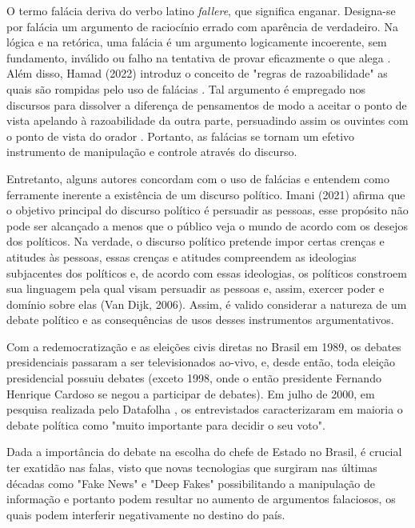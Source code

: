 \documentclass[12pt]{article}
\begin{document}
O termo falácia deriva do verbo latino \textit{fallere}, que significa enganar. Designa-se por falácia um argumento de raciocínio errado com aparência de verdadeiro. Na lógica e na retórica, uma falácia é um argumento logicamente incoerente, sem fundamento, inválido ou falho na tentativa de provar eficazmente o que alega \cite{Wikipédia-2}. Além disso, Hamad (2022) introduz o conceito de "regras de razoabilidade" as quais são rompidas pelo uso de falácias \cite{Hamad-3}. Tal argumento é empregado nos discursos para dissolver a diferença de pensamentos de modo a aceitar o ponto de vista apelando à razoabilidade da outra parte, persuadindo assim os ouvintes com o ponto de vista do orador \cite{Zilin-4}. Portanto, as falácias se tornam um efetivo instrumento de manipulação e controle através do discurso.

Entretanto, alguns autores concordam com o uso de falácias e entendem como ferramente inerente
a existência de um discurso político. Imani (2021) afirma que o objetivo principal do discurso político é persuadir as pessoas, esse propósito não pode ser alcançado a menos que o público veja o mundo de acordo com os desejos dos políticos. Na verdade, o discurso político pretende impor certas crenças e atitudes às pessoas, essas crenças e atitudes compreendem as ideologias subjacentes dos políticos e, de acordo com essas ideologias, os políticos constroem sua linguagem pela qual visam persuadir as pessoas e, assim, exercer poder e domínio sobre elas (Van Dijk, 2006). Assim, é valido considerar a natureza de um debate político e as consequências de usos desses instrumentos argumentativos.

Com a redemocratização e as eleições civis diretas no Brasil em 1989, os debates presidenciais passaram a ser televisionados ao-vivo, e, desde então, toda eleição presidencial possuiu debates (exceto 1998, onde o então presidente Fernando Henrique Cardoso se negou a participar de debates). Em julho de 2000, em pesquisa realizada pelo Datafolha \cite{Datafolha-11}, os entrevistados caracterizaram em maioria o debate política como "muito importante para decidir o seu voto".

Dada a importância do debate na escolha do chefe de Estado no Brasil, é crucial ter exatidão nas falas, visto que novas tecnologias que surgiram nas últimas décadas como "Fake News" e "Deep Fakes" possibilitando a manipulação de informação e portanto podem resultar no aumento de argumentos falaciosos, os quais podem interferir negativamente no destino do país.
\end{document}
